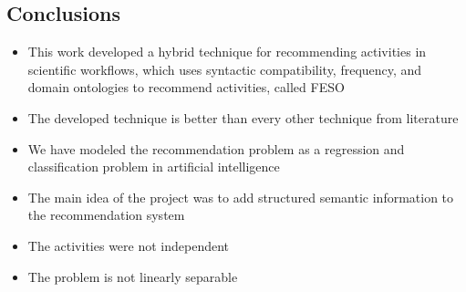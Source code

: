 \documentclass[40pt, a0, portrait]{a0poster}
\begin{document}
\begin{multicols}{2}
%
%


\color{SaddleBrown} %

\section*{Conclusions}

\begin{itemize}
\item This work developed a hybrid technique for recommending activities in scientific workflows, which uses syntactic compatibility, frequency, and domain ontologies to recommend activities, called FESO
\item The developed technique is better than every other technique from literature
\item We have modeled the recommendation problem as a regression and classification problem in artificial intelligence
\item The main idea of the project was to add structured semantic information to the recommendation system
\item The activities were not independent
\item The problem is not linearly separable
\end{itemize}

\color{DarkSlateGray} %


\end{multicols}
\end{document}
